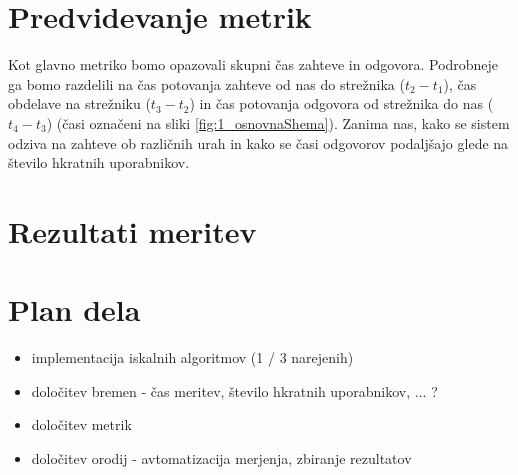 \section{Predvidevanje metrik}

Kot glavno metriko bomo opazovali skupni čas zahteve in odgovora.
Podrobneje ga bomo razdelili na čas potovanja zahteve od nas do strežnika ($t_2 - t_1$), čas obdelave na strežniku ($t_3 - t_2$) in čas potovanja odgovora od strežnika do nas ($t_4 - t_3$) (časi označeni na sliki \ref{fig:1_osnovnaShema}).
Zanima nas, kako se sistem odziva na zahteve ob različnih urah in kako se časi odgovorov podaljšajo glede na število hkratnih uporabnikov.

\section{Rezultati meritev}

\section{Plan dela}

\begin{itemize}
\item implementacija iskalnih algoritmov (1 / 3 narejenih)
\item določitev bremen - čas meritev, število hkratnih uporabnikov, ... ?
\item določitev metrik 
\item določitev orodij - avtomatizacija merjenja, zbiranje rezultatov
\end{itemize}


%
%

